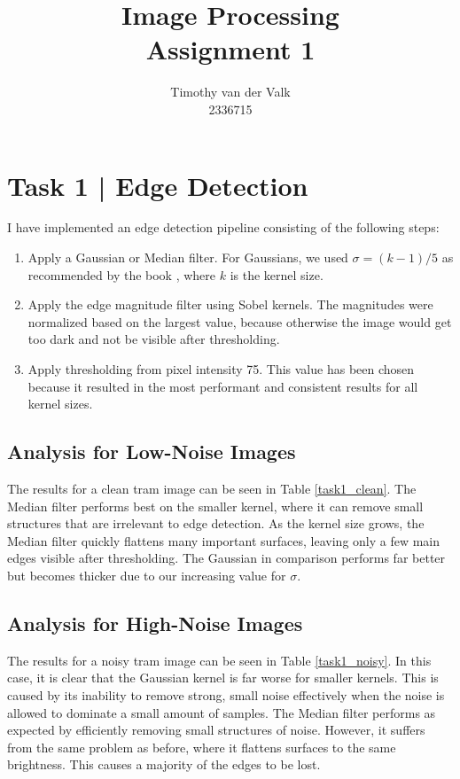 \documentclass[10pt, a4paper]{article}
\title{Image Processing\\Assignment 1}
\author{Timothy van der Valk\\2336715}
\begin{document}
\maketitle

\section*{Task 1 | Edge Detection} %

I have implemented an edge detection pipeline consisting of the following steps:
\begin{enumerate}
	\item Apply a Gaussian or Median filter. For Gaussians, we used $\sigma=(k-1)/5$ as recommended 
		by the book \cite[p.~114]{texbook}, where $k$ is the kernel size.
	\item Apply the edge magnitude filter using Sobel kernels. The magnitudes were
		normalized based on the largest value, because otherwise the image would get too dark
		and not be visible after thresholding.
	\item Apply thresholding from pixel intensity 75. This value has been chosen because
		it resulted in the most performant and consistent results for all kernel sizes.
\end{enumerate}

\subsection*{Analysis for Low-Noise Images}
The results for a clean tram image can be seen in Table \ref{task1_clean}.
The Median filter performs best on the smaller kernel, where it can remove small structures
that are irrelevant to edge detection. As the kernel size grows, the Median filter quickly
flattens many important surfaces, leaving only a few main edges visible after thresholding.
The Gaussian in comparison performs far better but becomes thicker due to our increasing value for $\sigma$.

\subsection*{Analysis for High-Noise Images}
The results for a noisy tram image can be seen in Table \ref{task1_noisy}.
In this case, it is clear that the Gaussian kernel is far worse for smaller kernels.
This is caused by its inability to remove strong, small noise effectively when the noise is
allowed to dominate a small amount of samples. The Median filter performs as expected
by efficiently removing small structures of noise. However, it suffers from the same problem
as before, where it flattens surfaces to the same brightness.
This causes a majority of the edges to be lost.
\end{document}
